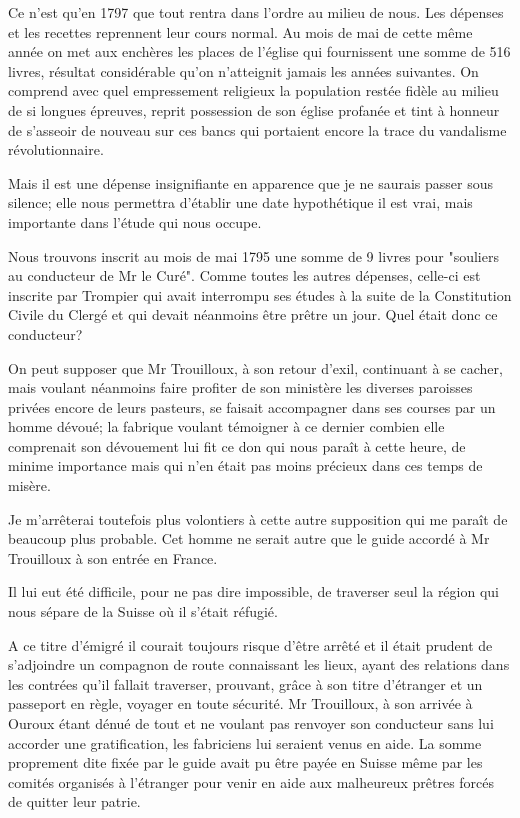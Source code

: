 Ce n'est qu'en 1797 que tout rentra dans l'ordre au milieu de nous. Les dépenses et les recettes reprennent leur cours normal. Au mois de mai de cette même année on met aux enchères les places de l'église qui fournissent une somme de 516 livres, résultat considérable qu'on n'atteignit jamais les années suivantes. On comprend avec quel empressement religieux la population restée fidèle au milieu de si longues épreuves, reprit possession de son église profanée et tint à honneur de s'asseoir de nouveau sur ces bancs qui portaient encore la trace du vandalisme révolutionnaire.

Mais il est une dépense insignifiante en apparence que je ne saurais passer sous silence; elle nous permettra d'établir une date hypothétique il est vrai, mais importante dans l'étude qui nous occupe.

Nous trouvons inscrit au mois de mai 1795 une somme de 9 livres pour "souliers au conducteur de Mr le Curé". Comme toutes les autres dépenses, celle-ci est inscrite par Trompier qui avait interrompu ses études à la suite de la Constitution Civile du Clergé et qui devait néanmoins être prêtre un jour. Quel était donc ce conducteur?

On peut supposer que Mr Trouilloux, à son retour d'exil, continuant à se cacher, mais voulant néanmoins faire profiter de son ministère les diverses paroisses privées encore de leurs pasteurs, se faisait accompagner dans ses courses par un homme dévoué; la fabrique voulant témoigner à ce dernier combien elle comprenait son dévouement lui fit ce don qui nous paraît à cette heure, de minime importance mais qui n'en était pas moins précieux dans ces temps de misère.

Je m'arrêterai toutefois plus volontiers à cette autre supposition qui me paraît de beaucoup plus probable. Cet homme ne serait autre que le guide accordé à Mr Trouilloux à son entrée en France.

Il lui eut été difficile, pour ne pas dire impossible, de traverser seul la région qui nous sépare de la Suisse où il s'était réfugié.

A ce titre d'émigré il courait toujours risque d'être arrêté et il était prudent de s'adjoindre un compagnon de route connaissant les lieux, ayant des relations dans les contrées qu'il fallait traverser, prouvant, grâce à son titre d'étranger et un passeport en règle, voyager en toute sécurité. Mr Trouilloux, à son arrivée à Ouroux étant dénué de tout et ne voulant pas renvoyer son conducteur sans lui accorder une gratification, les fabriciens lui seraient venus en aide. La somme proprement dite fixée par le guide avait pu être payée en Suisse même par les comités organisés à l'étranger pour venir en aide aux malheureux prêtres forcés de quitter leur patrie.

